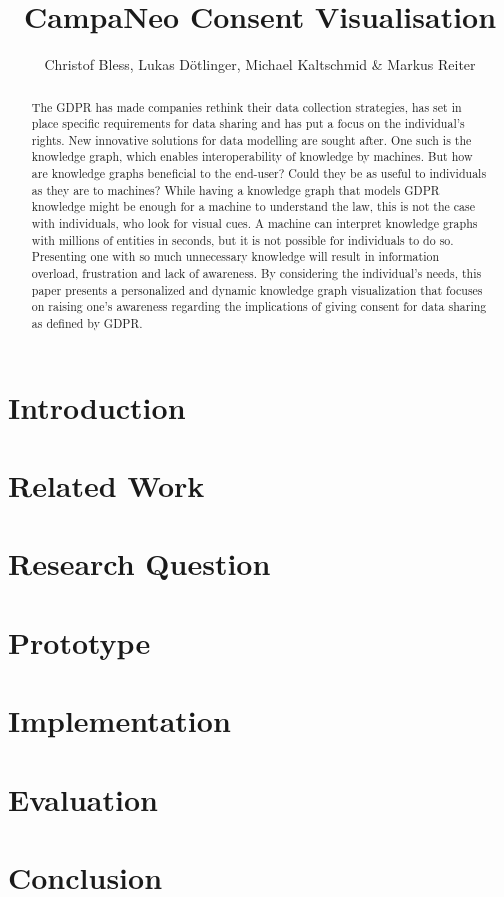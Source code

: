 \documentclass[notitlepage,11pt]{article}
\begin{document}
\title{CampaNeo Consent Visualisation}
\author{Christof Bless, Lukas Dötlinger, Michael Kaltschmid \& Markus Reiter}
\maketitle
\begin{abstract}
The GDPR has made companies rethink their data collection strategies, has set in place specific requirements for data sharing and has put a focus on the individual’s rights. New innovative solutions for data modelling are sought after. One such is the knowledge graph, which enables interoperability of knowledge by machines. But how are knowledge graphs beneficial to the end-user? Could they be as useful to individuals as they are to  machines? While having a knowledge graph that models GDPR knowledge might be enough for a machine to understand the law, this is not the case with individuals, who look for visual cues. A machine can interpret knowledge graphs with millions of entities in seconds, but it is not possible for individuals to do so. Presenting one with so much unnecessary knowledge will result in information overload, frustration and lack of awareness.
By considering the individual’s needs, this paper presents a personalized and dynamic knowledge graph visualization that focuses on raising one’s awareness regarding the implications of giving consent for data sharing as defined by GDPR.
\end{abstract}

\section{Introduction}
\label{sec:introduction}


\section{Related Work}
\label{sec:related_work}


\section{Research Question}
\label{sec:research_question}


\section{Prototype}
\label{sec:prototyping}


\section{Implementation}
\label{sec:implementation}


\section{Evaluation}
\label{sec:evaluation}


\section{Conclusion}
\label{sec:conclusion}


\newpage
\printbibliography
\end{document}
